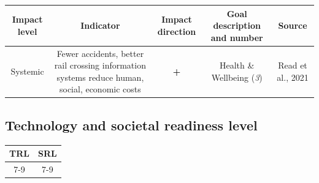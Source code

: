\documentclass[
]{book}
\begin{document}
\begin{longtable}[]{@{}ccccc@{}}
\toprule
\begin{minipage}[b]{0.17\columnwidth}\centering
Impact level\strut
\end{minipage} & \begin{minipage}[b]{0.16\columnwidth}\centering
Indicator\strut
\end{minipage} & \begin{minipage}[b]{0.17\columnwidth}\centering
Impact direction\strut
\end{minipage} & \begin{minipage}[b]{0.17\columnwidth}\centering
Goal description and number\strut
\end{minipage} & \begin{minipage}[b]{0.17\columnwidth}\centering
Source\strut
\end{minipage}\tabularnewline
\midrule
\endhead
\begin{minipage}[t]{0.17\columnwidth}\centering
Systemic\strut
\end{minipage} & \begin{minipage}[t]{0.16\columnwidth}\centering
Fewer accidents, better rail crossing information systems reduce human, social, economic costs\strut
\end{minipage} & \begin{minipage}[t]{0.17\columnwidth}\centering
\textbf{+}\strut
\end{minipage} & \begin{minipage}[t]{0.17\columnwidth}\centering
Health \& Wellbeing (\emph{3})\strut
\end{minipage} & \begin{minipage}[t]{0.17\columnwidth}\centering
Read et al., 2021\strut
\end{minipage}\tabularnewline
\bottomrule
\end{longtable}

\hypertarget{technology-and-societal-readiness-level-1}{%
\subsection*{Technology and societal readiness level}\label{technology-and-societal-readiness-level-1}}

\begin{longtable}[]{@{}cc@{}}
\toprule
TRL & SRL\tabularnewline
\midrule
\endhead
7-9 & 7-9\tabularnewline
\bottomrule
\end{longtable}
\end{document}
